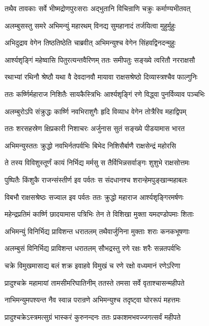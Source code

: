 \twolineshloka
{तथैव तावकाः सर्वे भीष्मद्रोणपुरःसराः}
{अद्भुतानि विचिन्राणि चक्रुः कर्माण्यभीतवत्}


\twolineshloka
{अलम्बुसस्तु समरे अभिमन्युं महारथम्}
{विनद्य सुमहानादं तर्जयित्वा मुहुर्मुहुः}


\twolineshloka
{अभिदुद्राव वेगेन तिष्ठतिष्ठेति चाब्रवीत्}
{अभिमन्युश्च वेगेन सिंहवद्विनदन्मुहुः}


\twolineshloka
{आर्श्यशृङ्गिं महेष्वासि पितुरत्यन्तवैरिणम्}
{ततः समीपतुः सङ्ख्ये त्वरितौ नरराक्षसौ}


\twolineshloka
{रथाभ्यां रथिनौ श्रेष्ठौ यथा वै देवदानवौ}
{मायावा राक्षसश्रेष्ठो दिव्यास्त्रश्चैव फाल्गुनिः}


\twolineshloka
{ततः कर्ष्णिर्महाराज निशितैः सायकैस्त्रिभिः}
{आर्श्यशृङ्गिं रणे विद्ध्वा पुनर्विव्याव पञ्चभिः}


\twolineshloka
{अलम्बुरोऽपि संक्रुद्धः कार्ष्णि नवभिराशुगैः}
{हृदि विव्याध वेगेन तोत्रैरिव महाद्विपम्}


\twolineshloka
{ततः शरसहस्रेण क्षिप्रकारी निशाचरः}
{अर्जुनास सुतं सङ्ख्ये पीडयामास भारत}


\twolineshloka
{अभिमन्युस्ततः क्रुद्धो नवभिर्नतपर्वभिः}
{बिभेद निशिसैर्बाणै राक्षसेन्द्रं महोरसि}


\twolineshloka
{ते तस्य विविशुस्तूर्णं कायं निर्भिद्य मर्मसु}
{स तैर्विभिन्नसर्वाङ्गः शुशुभे राक्षसोत्तमः}


\twolineshloka
{पुष्पितैः किंशुकै राजन्संस्तीर्ण इव पर्वतः}
{स संदधानश्च शरान्हेमपुङ्खान्महाबलः}


\twolineshloka
{विबभौ राक्षसश्रेष्ठः सज्वाल इव पर्वतः}
{ततः क्रुद्धो महाराज आर्श्यशृङ्गिरमर्षणः}


\twolineshloka
{महेन्द्रप्रतिमं कार्ष्णि छादयामास पत्रिभिः}
{तेन ते विशिखा मुक्ता यमदण्डोपमाः शिताः}


\twolineshloka
{अभिमन्युं विनिर्भिद्य प्राविशन्त धरातलम्}
{तथैवार्जुनिना मुक्ताः शराः कनकभूषणाः}


\twolineshloka
{अलम्बुसं विनिर्भिद्य प्राविशन्त धरातलम्}
{सौभद्रस्तु रणे रक्षः शरैः सन्नतपर्वभिः}


\twolineshloka
{चक्रे विमुखमासाद्य बलं शक्र इवाहवे}
{विमुखं च रणे रक्षो वध्यमानं रणेऽरिणा}


\twolineshloka
{प्रादुश्चक्रे महामायां तामसीमरिघातिनीम्}
{ततस्ते तमसा सर्वे वृताश्चासन्महीपते}


\twolineshloka
{नाभिमन्युमपश्यन्त नैव स्वान्न परान्रणे}
{अभिमन्युश्च तदृष्ट्वा घोररूपं महत्तमः}


\twolineshloka
{प्रादुश्चक्रेऽस्त्रमत्सुग्रं भास्करं कुरुनन्दनः}
{ततः प्रकाशमभवज्जगत्सर्वं महीपते}


